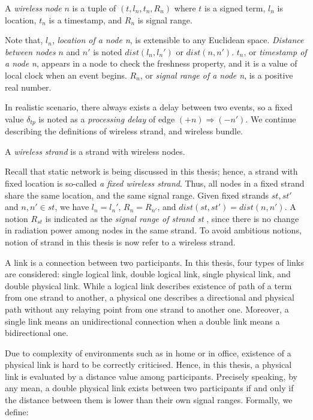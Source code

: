 \begin{Definition} A \emph{wireless node} $n$ is a tuple of $(t, l_n, t_n, R_n)$ where $t$ is a signed term, $l_n$ is location, $t_n$ is a timestamp, and $R_n$ is signal range.\end{Definition}

Note that, $l_n$, \textit{location of a node n}, is extensible to any Euclidean space. \textit{Distance between nodes} $n$ and $n'$ is noted $dist(l_n,l_n')$ or $dist(n,n')$. $t_n$, or \textit{timestamp of a node n}, appears in a node to check the freshness property, and it is a value of local clock when an event begins. $R_n$, or \textit{signal range of a node n}, is a positive real number. 

In realistic scenario, there always exists a delay between two events, so a fixed value $\delta_{tp}$ is noted as a \textit{processing delay} of edge $ (+n) \Rightarrow (-n')$. We continue describing the definitions of wireless strand, and wireless bundle. 

\begin{Definition} A \emph{wireless strand} is a strand with wireless nodes.
\end{Definition}

Recall that static network is being discussed in this thesis; hence, a strand with fixed location is so-called \textit{a fixed wireless strand}. Thus, all nodes in a fixed strand share the same location, and the same signal range. Given fixed strands $st, st'$ and $ n,n' \in st$, we have $l_n = l_n'$, $R_{n} = R_{n'}$, and $dist(st,st') = dist(n,n')$. A notion $R_{st}$ is indicated as the \textit{signal range of strand st} , since there is no change in radiation power among nodes in the same strand. To avoid ambitious notions, notion of strand in this thesis is now refer to a wireless strand. 

A link is a connection between two participants. In this thesis, four types of links are considered: single logical link, double logical link, single physical link, and double physical link. While a logical link describes existence of path of a term from one strand to another, a physical one describes a directional and physical path without any relaying point from one strand to another one. Moreover, a single link means an unidirectional connection when a double link means a bidirectional one. 

Due to complexity of environments such as in home or in office, existence of a physical link is hard to be correctly criticised. Hence, in this thesis, a physical link is evaluated by a distance value among participants. Precisely speaking, by any mean, a double physical link exists between two participants if and only if the distance between them is lower than their own signal ranges. Formally, we define:


